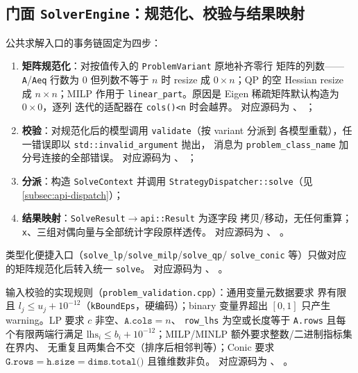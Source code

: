 \subsection{门面 \texttt{SolverEngine}：规范化、校验与结果映射}\label{subsec:api-facade}

公共求解入口的事务链固定为四步：
\begin{enumerate}
  \item \textbf{矩阵规范化}：对按值传入的 \texttt{ProblemVariant} 原地补齐零行
        矩阵的列数——\texttt{A}/\texttt{Aeq} 行数为 0 但列数不等于 $n$ 时
        resize 成 $0\times n$；QP 的空 Hessian resize 成 $n\times n$；MILP 作用于
        \texttt{linear\_part}。原因是 Eigen 稀疏矩阵默认构造为 $0\times0$，逐列
        迭代的适配器在 \texttt{cols()<n} 时会越界。
        对应源码为
        、
        ；
  \item \textbf{校验}：对规范化后的模型调用 \texttt{validate}（按 variant 分派到
        各模型重载），任一错误即以 \texttt{std::invalid\_argument} 抛出，
        消息为 \texttt{problem\_class\_name} 加分号连接的全部错误。
        对应源码为 、
        ；
  \item \textbf{分派}：构造 \texttt{SolveContext} 并调用
        \texttt{StrategyDispatcher::solve}（见 \ref{subsec:api-dispatch}）；
  \item \textbf{结果映射}：\texttt{SolveResult}$\to$\texttt{api::Result} 为逐字段
        拷贝/移动，无任何重算；\texttt{x}、三组对偶向量与全部统计字段原样透传。
        对应源码为 、
        。
\end{enumerate}
类型化便捷入口（\texttt{solve\_lp}/\texttt{solve\_milp}/\texttt{solve\_qp}/%
\texttt{solve\_conic} 等）只做对应的矩阵规范化后转入统一 \texttt{solve}。
对应源码为 、
。

输入校验的实现规则（\texttt{problem\_validation.cpp}）：通用变量元数据要求
界有限且 $l_j\le u_j+10^{-12}$（\texttt{kBoundEps}，硬编码）；binary 变量界超出
$[0,1]$ 只产生 warning。LP 要求 $c$ 非空、$\texttt{A.cols}=n$、
\texttt{row\_lhs} 为空或长度等于 \texttt{A.rows} 且每个有限两端行满足
$\mathrm{lhs}_i\le b_i+10^{-12}$；MILP/MINLP 额外要求整数/二进制指标集在界内、
无重复且两集合不交（排序后相邻判等）；Conic 要求
$\texttt{G.rows}=\texttt{h.size}=\texttt{dims.total()}$ 且锥维数非负。
对应源码为
、
。

